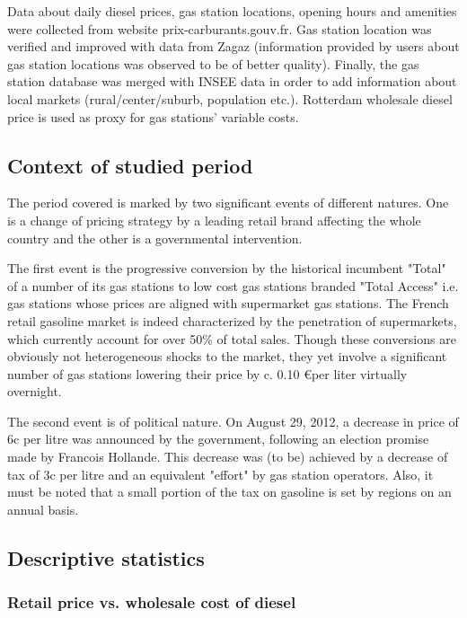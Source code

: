 \documentclass[11pt]{article}
\begin{document}
Data about daily diesel prices, gas station locations, opening hours and amenities were collected from website prix-carburants.gouv.fr. Gas station location was verified and improved with data from Zagaz (information provided by users about gas station locations was observed to be of better quality). Finally, the gas station database was merged with INSEE data in order to add information about local markets (rural/center/suburb, population etc.). Rotterdam wholesale diesel price is used as proxy for gas stations' variable costs.

\subsection{Context of studied period}

The period covered is marked by two significant events of different natures. One is a change of pricing strategy by a leading retail brand affecting the whole country and the other is a governmental intervention.

The first event is the progressive conversion by the historical incumbent "Total" of a number of its gas stations to low cost gas stations branded "Total Access" i.e. gas stations whose prices are aligned with supermarket gas stations. The French retail gasoline market is indeed characterized by the penetration of supermarkets, which currently account for over 50\% of total sales. Though these conversions are obviously not heterogeneous shocks to the market, they yet involve a significant number of gas stations lowering their price by c. 0.10 \euro per liter virtually overnight.

The second event is of political nature.
On August 29, 2012, a decrease in price of 6c per litre was announced by the government, following an election promise made by Francois Hollande. This decrease was (to be) achieved by a decrease of tax of 3c per litre and an equivalent "effort" by gas station operators. Also, it must be noted that a small portion of the tax on gasoline is set by regions on an annual basis.

\subsection{Descriptive statistics}

\subsubsection{Retail price vs. wholesale cost of diesel}
\end{document}
